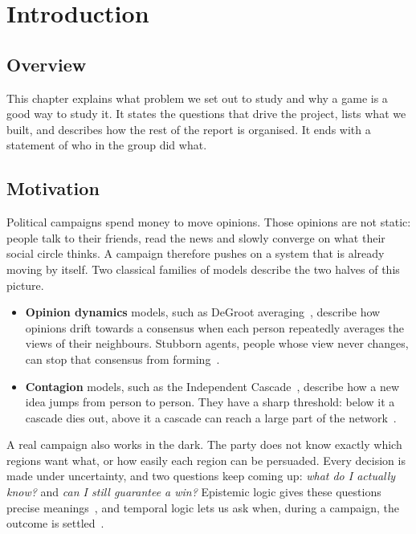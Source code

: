 \documentclass[11pt,a4paper,oneside]{report}
\newcommand{\overviewsection}{\section{Overview}}
\begin{document}
\chapter{Introduction}\label{ch:intro}

\overviewsection

This chapter explains what problem we set out to study and why a game is a good way to study it. It
states the questions that drive the project, lists what we built, and describes how the rest of the report
is organised. It ends with a statement of who in the group did what.

\section{Motivation}

Political campaigns spend money to move opinions. Those opinions are not static: people talk to their
friends, read the news and slowly converge on what their social circle thinks. A campaign therefore pushes
on a system that is already moving by itself. Two classical families of models describe the two halves of
this picture.
\begin{itemize}
  \item \textbf{Opinion dynamics} models, such as DeGroot averaging~\cite{degroot1974}, describe how
        opinions drift towards a consensus when each person repeatedly averages the views of their
        neighbours. Stubborn agents, people whose view never changes, can stop that consensus from
        forming~\cite{friedkin1990,mobilia2003}.
  \item \textbf{Contagion} models, such as the Independent Cascade~\cite{goldenberg2001,kempe2003}, describe
        how a new idea jumps from person to person. They have a sharp threshold: below it a cascade dies
        out, above it a cascade can reach a large part of the network~\cite{chakrabarti2008}.
\end{itemize}

A real campaign also works in the dark. The party does not know exactly which regions want what, or how
easily each region can be persuaded. Every decision is made under uncertainty, and two questions keep
coming up: \emph{what do I actually know?} and \emph{can I still guarantee a win?} Epistemic logic gives
these questions precise meanings~\cite{fagin1995}, and temporal logic lets us ask when, during a campaign,
the outcome is settled~\cite{pnueli1977}.
\end{document}
